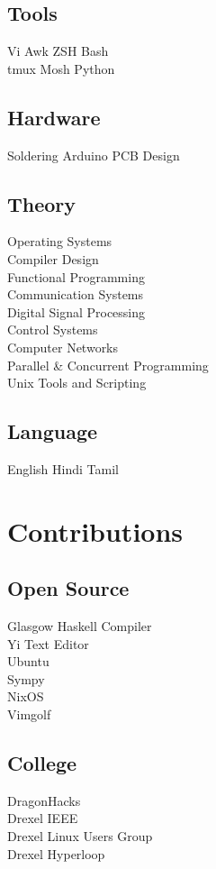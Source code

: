 \documentclass[]{deedy}
\begin{document}
\begin{minipage}[t]{0.33\textwidth}
\sectionsep
\subsection{Tools}
Vi \textbullet{} Awk \textbullet{} ZSH \textbullet{} Bash \\
tmux \textbullet{} Mosh \textbullet{} Python
\sectionsep

\subsection{Hardware}
Soldering \textbullet{} Arduino \textbullet{} PCB Design
\sectionsep

\subsection{Theory}
Operating Systems \\
Compiler Design \\
Functional Programming \\
Communication Systems \\
Digital Signal Processing \\
Control Systems \\
Computer Networks \\
Parallel \& Concurrent Programming \\
Unix Tools and Scripting
\sectionsep

\subsection{Language}
English \textbullet{} Hindi \textbullet{} Tamil


\section{Contributions}
\subsection{Open Source}
Glasgow Haskell Compiler \\
Yi Text Editor \\
Ubuntu \\
Sympy \\
NixOS \\
Vimgolf
\sectionsep

\subsection{College}
DragonHacks \\
Drexel IEEE \\
Drexel Linux Users Group \\
Drexel Hyperloop
\sectionsep

%
%

\end{minipage} 
\end{document}
